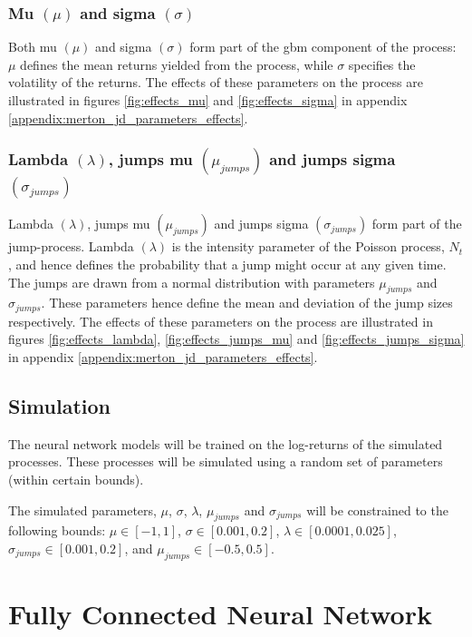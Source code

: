 \documentclass[11pt,oneside,openany,a4paper,english, report, goldenblock
]{usthesis}
\begin{document}
\subsubsection{Mu $\left(\mu\right)$ and sigma $\left(\sigma\right)$}

Both mu $\left(\mu\right)$ and sigma $\left(\sigma\right)$ form part of the \acrshort{gbm} component of the process: $\mu$ defines the mean returns yielded from the process, while $\sigma$ specifies the volatility of the returns. The effects of these parameters on the process are illustrated in figures \ref{fig:effects_mu} and \ref{fig:effects_sigma} in appendix \ref{appendix:merton_jd_parameters_effects}.

\subsubsection{Lambda $\left(\lambda\right)$, jumps mu $\left(\mu_{jumps}\right)$ and jumps sigma $\left(\sigma_{jumps}\right)$}

Lambda $\left(\lambda\right)$, jumps mu $\left(\mu_{jumps}\right)$ and jumps sigma $\left(\sigma_{jumps}\right)$ form part of the jump-process. Lambda $\left(\lambda\right)$ is the intensity parameter of the Poisson process, $N_t$, and hence defines the probability that a jump might occur at any given time. The jumps are drawn from a normal distribution with parameters $\mu_{jumps}$ and $\sigma_{jumps}$. These parameters hence define the mean and deviation of the jump sizes respectively. The effects of these parameters on the process are illustrated in figures \ref{fig:effects_lambda}, \ref{fig:effects_jumps_mu} and \ref{fig:effects_jumps_sigma} in appendix \ref{appendix:merton_jd_parameters_effects}.

\subsection{Simulation}
The neural network models will be trained on the log-returns of the simulated processes. These processes will be simulated using a random set of parameters (within certain bounds).

The simulated parameters, $\mu$, $\sigma$, $\lambda$, $\mu_{jumps}$ and $\sigma_{jumps}$ will be constrained to the following bounds: $\mu \in [-1, 1]$, $\sigma \in [0.001, 0.2]$, $\lambda\in [0.0001, 0.025]$, $\sigma_{jumps} \in [0.001, 0.2]$, and $\mu_{jumps}\in [-0.5, 0.5]$.

\section{Fully Connected Neural Network}
\end{document}
